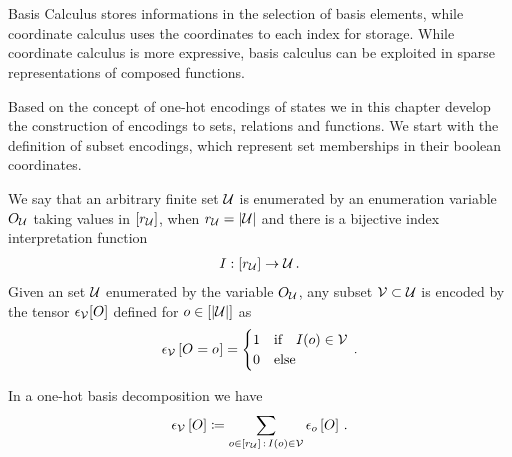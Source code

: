 \chapter{\chatextbasisCalculus}\label{cha:basisCalculus}

Basis Calculus stores informations in the selection of basis elements, while coordinate calculus uses the coordinates to each index for storage.
While coordinate calculus is more expressive, basis calculus can be exploited in sparse representations of composed functions.



Based on the concept of one-hot encodings of states we in this chapter develop the construction of encodings to sets, relations and functions.
We start with the definition of subset encodings, which represent set memberships in their boolean coordinates.

\begin{definition}
    \label{def:subsetEncoding}
    We say that an arbitrary finite set $\mathcal{U}$ is enumerated by an enumeration variable $O_{\mathcal{U}}$ taking values in $[r_{\mathcal{U}}]$, when $r_{\mathcal{U}}=\left|\mathcal{U}\right|$ and there is a bijective index interpretation function
    \begin{align*}
        I : [r_{\mathcal{U}}] \rightarrow \mathcal{U} \, .
    \end{align*}
    Given an set $\mathcal{U}$ enumerated by the variable $O_{\mathcal{U}}$, any subset $\mathcal{V}\subset\mathcal{U}$ is encoded by the tensor $\epsilon_{\mathcal{V}}[O]$ defined for $o\in[\left|\mathcal{U}\right|]$ as
    \begin{align*}
        \epsilon_{\mathcal{V}}\left[O_{}=o_{}\right]
        = \begin{cases}
              1 & \text{if} \quad I(o) \in \mathcal{V} \\
              0 & \text{else}
        \end{cases} \, .
    \end{align*}
\end{definition}

In a one-hot basis decomposition we have
\begin{align*}
    \epsilon_{\mathcal{V}}\left[O\right]
    \coloneqq \sum_{o\in[r_{\mathcal{U}}]\,:\,I(o)\in\mathcal{V}}\epsilon_{o}\left[O\right] \, .
\end{align*}


